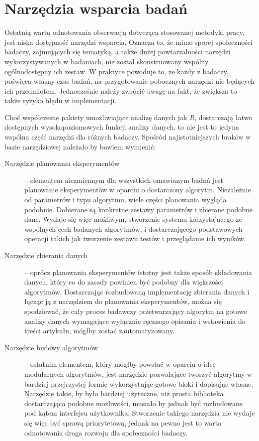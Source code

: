 \documentclass[12pt,a4paper]{report}
\begin{document}
{{{{{{{\section{Narzędzia wsparcia badań}
\par{
Ostatnią wartą odnotowania obserwacją dotyczącą stosowanej metodyki pracy, jest niska dostępność narzędzi wsparcia. Oznacza to, że mimo sporej społeczności badaczy, zajmujących się tematyką, a także dużej powtarzalności narzędzi wykorzystywanych w badaniach, nie został skonstruowany wspólny ogólnodostępny ich zestaw. W praktyce powoduje to, że każdy z badaczy, poświęca własny czas badań, na przygotowanie pobocznych narzędzi nie będących ich przedmiotem. Jednocześnie należy zwrócić uwagę na fakt, że zwiększa to także ryzyko błędu w implementacji.
}
\par{
Choć współczesne pakiety umożliwiające analizę danych jak \emph{R}, dostarczają łatwo dostępnych wysokopoziomowych funkcji analizy danych, to nie jest to jedyna wspólna część narzędzi dla różnych badaczy. Spośród najistotniejszych braków w bazie narzędziowej należało by bowiem wymienić:
\begin{description}
\item[Narzędzie planowania eksperymentów] -- elementem niezmiennym dla wszystkich omawianym badań jest planowanie eksperymentów w oparciu o dostarczony algorytm. Niezależnie od parametrów i typu algorytmu, wiele części planowania wygląda podobnie. Dobierane są konkretne zestawy parametrów i zbierane podobne dane. Wydaje się więc możliwym, stworzenie systemu korzystającego ze wspólnych cech badanych algorytmów, i dostarczającego podstawowych operacji takich jak tworzenie zestawu testów i przeglądanie ich wyników.
\item[Narzędzie zbierania danych] -- oprócz planowania eksperymentów istotny jest także sposób składowania danych, który co do zasady powinien być podobny dla większości algorytmów. Dostarczając rozbudowaną implementację zbierania danych i łącząc ją z narzędziem do planowania eksperymentów, można się spodziewać, że cały proces badawczy przetwarzający algorytm na gotowe analizy danych wymagające wyłącznie ręcznego opisania i wstawienia do treści artykułu, mógłby zostać zautomatyzowany.
\item[Narzędzie budowy algorytmów] -- ostatnim elementem, który mógłby powstać w oparciu o ideę modularnych algorytmów, jest narzędzie pozwalające tworzyć algorytmy w bardziej przejrzystej formie wykorzystując gotowe bloki i dopisując własne. Narzędzie takie, by było bardziej użyteczne, niż prosta biblioteka dostarczająca podobne możliwości, musiało by jednak być rozbudowane pod kątem interfejsu użytkownika. Stworzenie takiego narzędzia nie wydaje się więc być sprawą priorytetową, jednak na pewno jest to warta odnotowania droga rozwoju dla społeczności badaczy.

\end{description}}}}}}}}}
\end{document}
